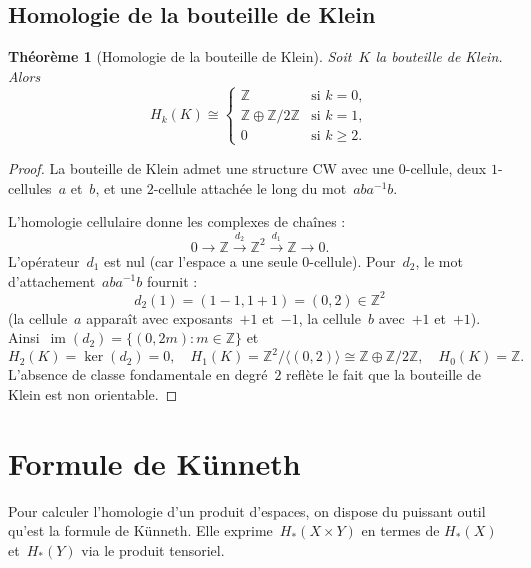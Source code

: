 \documentclass[12pt,a4paper,openany]{book}
\theoremstyle{definition}
\theoremstyle{plain}
\newtheorem{theoreme}[definition]{Théorème}
\theoremstyle{remark}
\newcommand{\Z}{\mathbb{Z}}
\DeclareMathOperator{\im}{im}
\begin{document}
\subsection{Homologie de la bouteille de Klein}\label{subsec:homologie-klein}

\begin{theoreme}[Homologie de la bouteille de Klein]\label{thm:homologie-klein}
Soit~$K$ la bouteille de Klein. Alors
\[
  H_k(K) \cong
  \begin{cases}
    \Z            & \text{si } k = 0,\\
    \Z \oplus \Z/2\Z & \text{si } k = 1,\\
    0             & \text{si } k \geqslant 2.
  \end{cases}
\]
\end{theoreme}

\begin{proof}
La bouteille de Klein admet une structure CW avec une $0$-cellule, deux $1$-cellules~$a$ et~$b$,
et une $2$-cellule attachée le long du mot~$aba^{-1}b$.

L'homologie cellulaire donne les complexes de chaînes :
\[
  0 \to \Z \xrightarrow{d_2} \Z^2 \xrightarrow{d_1} \Z \to 0.
\]
L'opérateur~$d_1$ est nul (car l'espace a une seule $0$-cellule). Pour~$d_2$, le mot
d'attachement~$aba^{-1}b$ fournit :
\[
  d_2(1) = (1 - 1, 1 + 1) = (0, 2) \in \Z^2
\]
(la cellule~$a$ apparaît avec exposants~$+1$ et~$-1$, la cellule~$b$ avec~$+1$ et~$+1$).
Ainsi~$\im(d_2) = \{(0, 2m) : m \in \Z\}$ et
\[
  H_2(K) = \ker(d_2) = 0, \quad
  H_1(K) = \Z^2 / \langle (0, 2) \rangle \cong \Z \oplus \Z/2\Z, \quad
  H_0(K) = \Z.
\]
L'absence de classe fondamentale en degré~$2$ reflète le fait que la bouteille de Klein
est non orientable.
\end{proof}

\section{Formule de Künneth}\label{sec:kunneth}

Pour calculer l'homologie d'un produit d'espaces, on dispose du puissant outil
qu'est la formule de Künneth. Elle exprime~$H_*(X \times Y)$ en termes de
$H_*(X)$ et~$H_*(Y)$ via le produit tensoriel.
\end{document}

